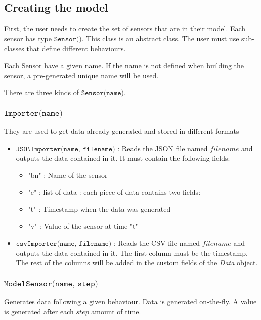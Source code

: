 \subsection{Creating the model}

First, the user needs to create the set of sensors that are in their model.
Each sensor has type $\texttt{Sensor()}$. This class is an abstract class.
The user must use sub-classes that define different behaviours.

Each Sensor have a given name. If the name is not defined when building the
sensor, a pre-generated unique name will be used.

There are three kinds of $\texttt{Sensor(name)}$.

\subsubsection{$\texttt{Importer(name)}$}
They are used to get data already generated and stored in different formats
\begin{itemize}
    \item $\texttt{JSONImporter(name, filename)}$ : Reads the JSON file named
        $filename$ and outputs the data contained in it. It must contain the
        following fields:
        \begin{itemize}
            \item "bn" : Name of the sensor
            \item "e" : list of data : each piece of data contains two fields:
            \item "t" : Timestamp when the data was generated
            \item "v" : Value of the sensor at time "t"
        \end{itemize}
    \item $\texttt{csvImporter(name, filename)}$ : Reads the CSV file named
        $filename$ and outputs the data contained in it. The first column must
        be the timestamp. The rest of the columns will be added in the custom
        fields of the \emph{Data} object.
\end{itemize}

\subsubsection{$\texttt{ModelSensor(name, step)}$}
Generates data following a given behaviour. Data is generated on-the-fly. A
value is generated after each $step$ amount of time.

